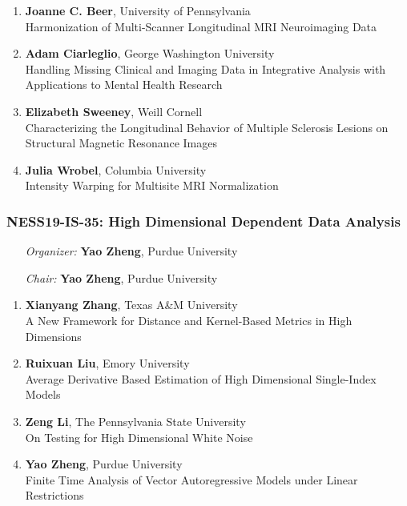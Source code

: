 \begin{enumerate}
\item \textbf{Joanne C. Beer}, University of Pennsylvania \\
Harmonization of Multi-Scanner Longitudinal MRI Neuroimaging Data
\item \textbf{Adam Ciarleglio}, George Washington University \\
Handling Missing Clinical and Imaging Data in Integrative Analysis with Applications to Mental Health Research
\item \textbf{Elizabeth Sweeney}, Weill Cornell \\
Characterizing the Longitudinal Behavior of Multiple Sclerosis Lesions on Structural Magnetic Resonance Images
\item \textbf{Julia Wrobel}, Columbia University \\
Intensity Warping for Multisite MRI Normalization
\end{enumerate}

\subsubsection*{NESS19-IS-35: High Dimensional Dependent Data Analysis}

\begin{enumerate}[align=left]
\item [\emph{Organizer:}] \textbf{Yao Zheng}, Purdue University
\item [\emph{Chair:}] \textbf{Yao Zheng}, Purdue University
\end{enumerate}

\begin{enumerate}
\item \textbf{Xianyang Zhang}, Texas A\&M University \\
A New Framework for Distance and Kernel-Based Metrics in High Dimensions
\item \textbf{Ruixuan Liu}, Emory University \\
Average Derivative Based Estimation of High Dimensional Single-Index Models
\item \textbf{Zeng Li}, The Pennsylvania State University \\
On Testing for High Dimensional White Noise
\item \textbf{Yao Zheng}, Purdue University \\
Finite Time Analysis of Vector Autoregressive Models under Linear Restrictions
\end{enumerate}

